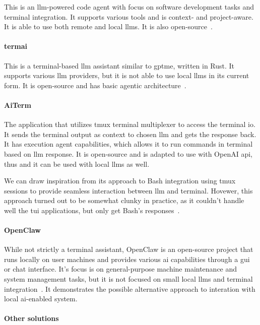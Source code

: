 This is an \gls{llm}-powered code agent with focus on software
development tasks and
terminal integration. It supports various tools and is context- and
project-aware. It is able to use both remote and local \glspl{llm}. It is also
open-source~\cite{aider-web,aider-docs}.

\paragraph{termai}

This is a terminal-based \gls{llm} assistant similar to gptme,
written in Rust. It
supports various \gls{llm} providers, but it is not able to use local
\glspl{llm} in its
current form. It is open-source and has basic agentic
architecture~\cite{termai-web}.

\paragraph{AiTerm}

The application that utilizes tmux terminal multiplexer to access the
terminal \gls{io}. It sends the terminal output as context to chosen
\gls{llm} and gets the response back. It has execution agent
capabilities, which allows it to run commands in terminal based on
\gls{llm} response. It is open-source and is adapted to use with
OpenAI \gls{api}, thus and it can be used with local \glspl{llm} as well.

We can draw inspiration from its approach to Bash integration using
tmux sessions to provide seamless interaction between \gls{llm} and
terminal. Hovewer, this approach turned out to be somewhat clunky in
practice, as it couldn't handle well the \gls{tui} applications, but
only get Bash's responses~\cite{aiterm-web}.

\paragraph{OpenClaw}
While not strictly a terminal assistant, OpenClaw is an open-source project that
runs locally on user machines and provides various \gls{ai} capabilities through
a \gls{gui} or chat interface. It's focus is on general-purpose machine
maintenance and system management tasks, but it is not focused on small local
\glspl{llm} and terminal integration~\cite{openclaw_website}. It demonstrates the
possible alternative approach to interation with local \gls{ai}-enabled system.

\paragraph{Other solutions}

